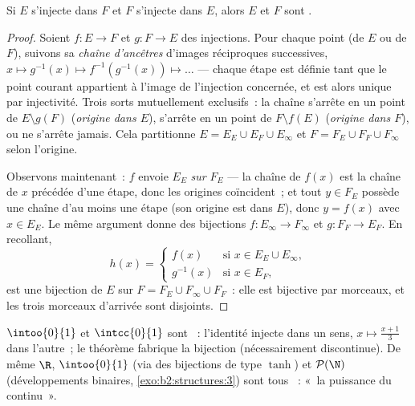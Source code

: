 \begin{theorem}\label{thm:b2:structures:cantorbernstein}
Si $E$ s'injecte dans $F$ et $F$ s'injecte dans $E$, alors $E$ et $F$
sont .
\end{theorem}

\begin{proof}
Soient $f \colon E \to F$ et $g \colon F \to E$ des injections. Pour
chaque point (de $E$ ou de $F$), suivons sa \emph{chaîne d'ancêtres}
d'images réciproques successives, $x \mapsto g^{-1}(x) \mapsto
f^{-1}(g^{-1}(x)) \mapsto \dots$ --- chaque étape est définie tant que
le point courant appartient à l'image de l'injection concernée, et
est alors unique par injectivité. Trois sorts mutuellement exclusifs~:
la chaîne s'arrête en un point de $E \setminus g(F)$ (\emph{origine
dans $E$}), s'arrête en un point de $F \setminus f(E)$ (\emph{origine
dans $F$}), ou ne s'arrête jamais. Cela partitionne $E = E_E \cup E_F
\cup E_\infty$ et $F = F_E \cup F_F \cup F_\infty$ selon l'origine.

Observons maintenant~: $f$ envoie $E_E$ \emph{sur} $F_E$ --- la chaîne
de $f(x)$ est la chaîne de $x$ précédée d'une étape, donc les origines
coïncident~; et tout $y \in F_E$ possède une chaîne d'au moins une
étape (son origine est dans $E$), donc $y = f(x)$ avec $x \in E_E$. Le
même argument donne des bijections $f \colon E_\infty \to F_\infty$ et
$g \colon F_F \to E_F$. En recollant,
\[
h(x) =
\begin{cases}
f(x) & \text{si } x \in E_E \cup E_\infty,\\
g^{-1}(x) & \text{si } x \in E_F,
\end{cases}
\]
est une bijection de $E$ sur $F = F_E \cup F_\infty \cup F_F$~: elle
est bijective par morceaux, et les trois morceaux d'arrivée sont
disjoints.
\end{proof}

\begin{example}\label{ex:b2:structures:cbexample}
$\intoo{0}{1}$ et $\intcc{0}{1}$ sont ~: l'identité
injecte dans un sens, $x \mapsto \frac{x + 1}{3}$ dans l'autre~; le
théorème fabrique la bijection (nécessairement discontinue). De même
$\R$, $\intoo{0}{1}$ (via des bijections de type $\tanh$) et
$\mathcal{P}(\N)$ (développements binaires, \cref{exo:b2:structures:3})
sont tous ~: «~la puissance du continu~».
\end{example}

